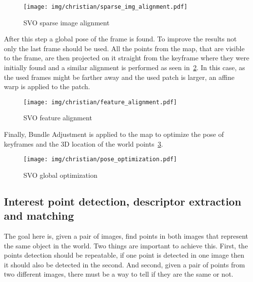 \begin{figure}[htpb]
  \centering
  \texttt{[image: img/christian/sparse\_img\_alignment.pdf]}
  \caption{SVO sparse image alignment \cite{Forster2014}}
  \label{fig:svo_img_alig}
\end{figure}

After this step a global pose of the frame is found. To improve the results not only the last frame should be used. All the points from the map, that are visible to the frame, are then projected on it straight from the keyframe where they were initially found and a similar alignment is performed as seen in~\ref{fig:svo_feature_align}. In this case, as the used frames might be farther away and the used patch is larger, an affine warp is applied to the patch. \\

\begin{figure}[htpb]
  \centering
  \texttt{[image: img/christian/feature\_alignment.pdf]}
  \caption{SVO feature alignment \cite{Forster2014}}
  \label{fig:svo_feature_align}
\end{figure}

Finally, Bundle Adjustment is applied to the map to optimize the pose of keyframes and the 3D location of the world points~\ref{fig:svo_global_optimization}.\\

\begin{figure}[htpb]
  \centering
  \texttt{[image: img/christian/pose\_optimization.pdf]}
  \caption{SVO global optimization \cite{Forster2014}}
  \label{fig:svo_global_optimization}
\end{figure}

\subsection{Interest point detection, descriptor extraction and matching}
\label{ssub:interest_point_detection_descriptor_extraction_and_matching}

The goal here is, given a pair of images, find points in both images that represent the same object in the world. Two things are important to achieve this. First, the points detection should be repeatable, if one point is detected in one image then it should also be detected in the second. And second, given a pair of points from two different images, there must be a way to tell if they are the same or not.\\

